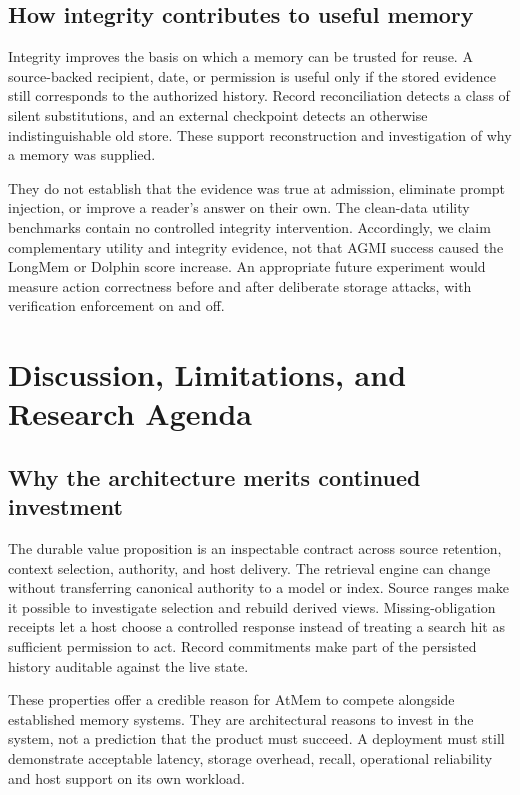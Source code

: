 \documentclass[10pt,twocolumn]{article}
\begin{document}
\subsection{How integrity contributes to useful memory}
Integrity improves the basis on which a memory can be trusted for reuse. A source-backed recipient, date, or permission is useful only if the stored evidence still corresponds to the authorized history. Record reconciliation detects a class of silent substitutions, and an external checkpoint detects an otherwise indistinguishable old store. These support reconstruction and investigation of why a memory was supplied.

They do not establish that the evidence was true at admission, eliminate prompt injection, or improve a reader's answer on their own. The clean-data utility benchmarks contain no controlled integrity intervention. Accordingly, we claim complementary utility and integrity evidence, not that AGMI success caused the LongMem or Dolphin score increase. An appropriate future experiment would measure action correctness before and after deliberate storage attacks, with verification enforcement on and off.

\section{Discussion, Limitations, and Research Agenda}
\subsection{Why the architecture merits continued investment}
The durable value proposition is an inspectable contract across source retention, context selection, authority, and host delivery. The retrieval engine can change without transferring canonical authority to a model or index. Source ranges make it possible to investigate selection and rebuild derived views. Missing-obligation receipts let a host choose a controlled response instead of treating a search hit as sufficient permission to act. Record commitments make part of the persisted history auditable against the live state.

These properties offer a credible reason for AtMem to compete alongside established memory systems. They are architectural reasons to invest in the system, not a prediction that the product must succeed. A deployment must still demonstrate acceptable latency, storage overhead, recall, operational reliability and host support on its own workload.
\end{document}
